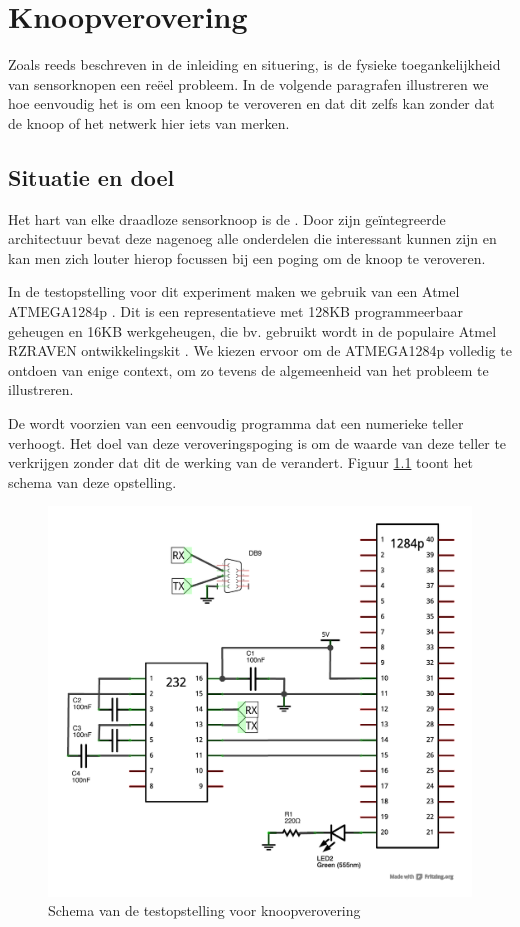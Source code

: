 
\chapter{Knoopverovering}
\label{appendix:node-capture}

Zoals reeds beschreven in de inleiding en situering, is de fysieke
toegankelijkheid van sensorknopen een re\"eel probleem. In de volgende
paragrafen illustreren we hoe eenvoudig het is om een knoop te veroveren en dat
dit zelfs kan zonder dat de knoop of het netwerk hier iets van merken.

\section{Situatie en doel}

Het hart van elke draadloze sensorknoop is de \mcu. Door zijn ge\"integreerde
architectuur bevat deze nagenoeg alle onderdelen die interessant kunnen zijn en
kan men zich louter hierop focussen bij een poging om de knoop te veroveren.

In de testopstelling voor dit experiment maken we gebruik van een Atmel
ATMEGA1284p \citep{datasheet:atmega1284p}. Dit is een representatieve \mcu met
128KB programmeerbaar geheugen en 16KB werkgeheugen, die bv. gebruikt wordt in
de populaire Atmel RZRAVEN ontwikkelingskit \citep{manual:rzraven}. We kiezen
ervoor om de ATMEGA1284p volledig te ontdoen van enige context, om zo tevens de
algemeenheid van het probleem te illustreren.

De \mcu wordt voorzien van een eenvoudig programma dat een numerieke teller
verhoogt. Het doel van deze veroveringspoging is om de waarde van deze teller
te verkrijgen zonder dat dit de werking van de \mcu verandert. Figuur
\ref{fig:node-capture-schematic} toont het schema van deze opstelling.

\begin{figure}[ht]
  \centering
  \includegraphics[width=0.7\linewidth]{resources/node-capture-schematic.pdf}
  \caption{Schema van de testopstelling voor knoopverovering}
  \label{fig:node-capture-schematic}
\end{figure}

